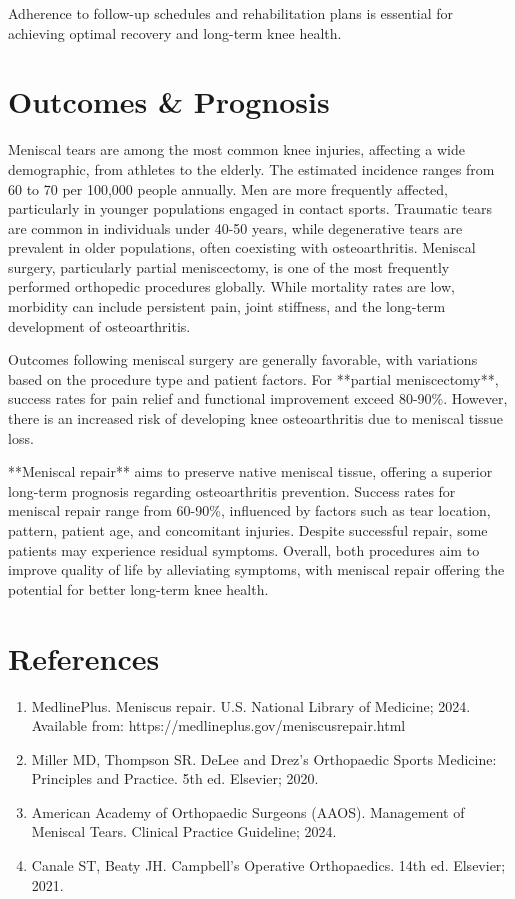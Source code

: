 Adherence to follow-up schedules and rehabilitation plans is essential for achieving optimal recovery and long-term knee health.

\section*{Outcomes \& Prognosis}
Meniscal tears are among the most common knee injuries, affecting a wide demographic, from athletes to the elderly. The estimated incidence ranges from 60 to 70 per 100,000 people annually. Men are more frequently affected, particularly in younger populations engaged in contact sports. Traumatic tears are common in individuals under 40-50 years, while degenerative tears are prevalent in older populations, often coexisting with osteoarthritis. Meniscal surgery, particularly partial meniscectomy, is one of the most frequently performed orthopedic procedures globally. While mortality rates are low, morbidity can include persistent pain, joint stiffness, and the long-term development of osteoarthritis.

Outcomes following meniscal surgery are generally favorable, with variations based on the procedure type and patient factors. For **partial meniscectomy**, success rates for pain relief and functional improvement exceed 80-90\%. However, there is an increased risk of developing knee osteoarthritis due to meniscal tissue loss.

**Meniscal repair** aims to preserve native meniscal tissue, offering a superior long-term prognosis regarding osteoarthritis prevention. Success rates for meniscal repair range from 60-90\%, influenced by factors such as tear location, pattern, patient age, and concomitant injuries. Despite successful repair, some patients may experience residual symptoms. Overall, both procedures aim to improve quality of life by alleviating symptoms, with meniscal repair offering the potential for better long-term knee health.

\section*{References}
\begin{enumerate}
  \item MedlinePlus. Meniscus repair. U.S. National Library of Medicine; 2024. Available from: https://medlineplus.gov/meniscusrepair.html
  
  \item Miller MD, Thompson SR. DeLee and Drez's Orthopaedic Sports Medicine: Principles and Practice. 5th ed. Elsevier; 2020.
  
  \item American Academy of Orthopaedic Surgeons (AAOS). Management of Meniscal Tears. Clinical Practice Guideline; 2024.
  
  \item Canale ST, Beaty JH. Campbell's Operative Orthopaedics. 14th ed. Elsevier; 2021.
\end{enumerate}

\clearpage
